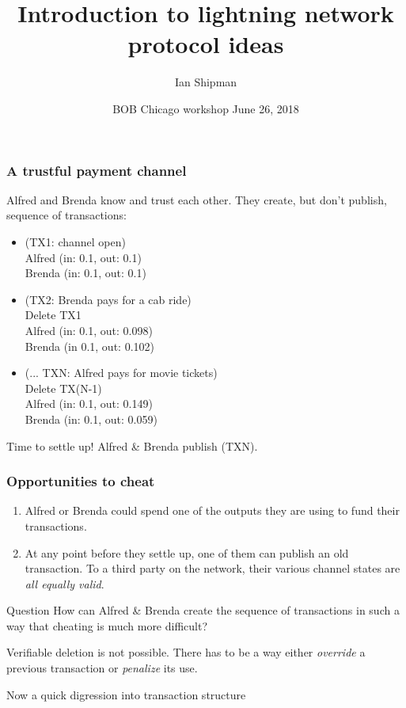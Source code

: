 \documentclass{beamer}
\title{Introduction to lightning network protocol ideas}
\author{Ian Shipman}
\date{BOB Chicago {workshop} June 26, 2018}
\begin{document}
\frame{\titlepage}
\begin{frame}
	\frametitle{A trustful payment channel}
	Alfred and Brenda know and trust each other.  They create, but don't publish, 
	sequence of transactions:
	\begin{itemize}
		\item (TX1: channel open) \\ 
			Alfred (in: 0.1, out: 0.1) \\
			Brenda (in: 0.1, out: 0.1)
		\item (TX2: Brenda pays for a cab ride) \\
			Delete TX1 \\
			Alfred (in: 0.1, out: 0.098) \\
			Brenda (in 0.1, out: 0.102)
		\item (... TXN: Alfred pays for movie tickets) \\
			Delete TX(N-1) \\ 
			Alfred (in: 0.1, out: 0.149) \\
			Brenda (in: 0.1, out: 0.059)
	\end{itemize}
	Time to settle up!  Alfred \& Brenda publish (TXN).
\end{frame}
\begin{frame}
	\frametitle{Opportunities to cheat}
	\begin{enumerate}
		\item Alfred or Brenda could spend one of the outputs they are using to 
			fund their transactions. \pause
		\item At any point before they settle up, one of them can 
			publish an old transaction.  To a third party on the network, their 
			various channel states are \emph{all equally valid}.  
	\end{enumerate}
	\pause
	\begin{block}{Question}
		How can Alfred \& Brenda create the sequence of transactions in such a way 
		that cheating is much more difficult?
	\end{block}
	\pause
	Verifiable deletion is not possible.  There has to be a way either 
	\emph{override} a previous transaction or \emph{penalize} its use.
\end{frame}
\begin{frame}
	Now a quick digression into transaction structure
\end{frame}
\end{document}
